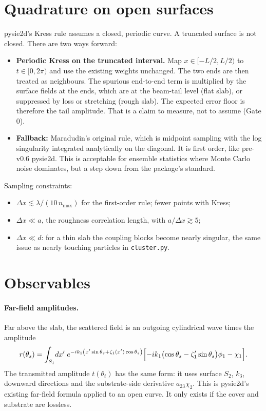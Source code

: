 \documentclass[11pt,a4paper]{article}
\begin{document}
\section{Quadrature on open surfaces}

pysie2d's Kress rule assumes a closed, periodic curve. A truncated surface is not
closed. There are two ways forward:
\begin{itemize}
  \item \textbf{Periodic Kress on the truncated interval.} Map $x\in[-L/2,L/2)$ to
        $t\in[0,2\pi)$ and use the existing weights unchanged. The two ends are then treated as
        neighbours. The spurious end-to-end term is multiplied by the surface
        fields at the ends, which are at the beam-tail level (flat slab), or suppressed by loss
        or stretching (rough slab). The expected error floor is therefore the tail amplitude. That is a
        claim to measure, not to assume (Gate 0).
  \item \textbf{Fallback:} Maradudin's original rule, which is midpoint sampling with the
        log singularity integrated analytically on the diagonal. It is first order, like pre-v0.6 pysie2d.
        This is acceptable for ensemble statistics where Monte Carlo noise dominates,
        but a step down from the package's standard.
\end{itemize}
Sampling constraints:
\begin{itemize}
  \item $\Delta x \lesssim \lambda/(10\,n_{\max})$ for the first-order rule; fewer points with Kress;
  \item $\Delta x \ll a$, the roughness correlation length, with $a/\Delta x \gtrsim 5$;
  \item $\Delta x \ll d$: for a thin slab the coupling blocks become nearly singular,
        the same issue as nearly touching particles in \texttt{cluster.py}.
\end{itemize}

\section{Observables}

\paragraph{Far-field amplitudes.} Far above the slab, the scattered field is an outgoing
cylindrical wave times the amplitude
\begin{equation}
 r(\theta_s) = \int_{S_1}\! dx'\;
   e^{-ik_1\left(x'\sin\theta_s + \zeta_1(x')\cos\theta_s\right)}
   \Bigl[-ik_1\bigl(\cos\theta_s - \zeta_1'\sin\theta_s\bigr)\phi_1 - \chi_1\Bigr].
\end{equation}
The transmitted amplitude $t(\theta_t)$ has the same form: it uses surface $S_2$, $k_3$, downward
directions and the substrate-side derivative $a_{23}\chi_2$. This is pysie2d's
existing far-field formula applied to an open curve. It only exists if
the cover and substrate are lossless.
\end{document}
